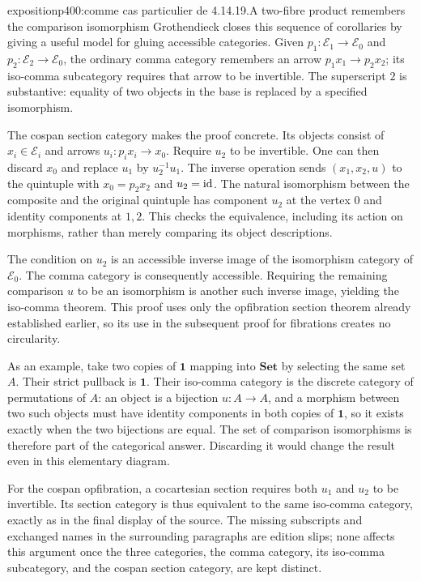 \begin{dcomment}{exposition}{p400:comme cas particulier de 4.14.19.}{A two-fibre product remembers the comparison isomorphism}
Grothendieck closes this sequence of corollaries by giving a useful model for gluing accessible categories. Given $p_1:\mathcal E_1\to\mathcal E_0$ and $p_2:\mathcal E_2\to\mathcal E_0$, the ordinary comma category remembers an arrow $p_1x_1\to p_2x_2$; its iso-comma subcategory requires that arrow to be invertible. The superscript $2$ is substantive: equality of two objects in the base is replaced by a specified isomorphism.

The cospan section category makes the proof concrete. Its objects consist of $x_i\in\mathcal E_i$ and arrows $u_i:p_ix_i\to x_0$. Require $u_2$ to be invertible. One can then discard $x_0$ and replace $u_1$ by $u_2^{-1}u_1$. The inverse operation sends $(x_1,x_2,u)$ to the quintuple with $x_0=p_2x_2$ and $u_2=\mathrm{id}$. The natural isomorphism between the composite and the original quintuple has component $u_2$ at the vertex $0$ and identity components at $1,2$. This checks the equivalence, including its action on morphisms, rather than merely comparing its object descriptions.

The condition on $u_2$ is an accessible inverse image of the isomorphism category of $\mathcal E_0$. The comma category is consequently accessible. Requiring the remaining comparison $u$ to be an isomorphism is another such inverse image, yielding the iso-comma theorem. This proof uses only the opfibration section theorem already established earlier, so its use in the subsequent proof for fibrations creates no circularity.

As an example, take two copies of $\mathbf1$ mapping into $\mathbf{Set}$ by selecting the same set $A$. Their strict pullback is $\mathbf1$. Their iso-comma category is the discrete category of permutations of $A$: an object is a bijection $u:A\to A$, and a morphism between two such objects must have identity components in both copies of $\mathbf1$, so it exists exactly when the two bijections are equal. The set of comparison isomorphisms is therefore part of the categorical answer. Discarding it would change the result even in this elementary diagram.

For the cospan opfibration, a cocartesian section requires both $u_1$ and $u_2$ to be invertible. Its section category is thus equivalent to the same iso-comma category, exactly as in the final display of the source. The missing subscripts and exchanged names in the surrounding paragraphs are edition slips; none affects this argument once the three categories, the comma category, its iso-comma subcategory, and the cospan section category, are kept distinct.
\end{dcomment}


